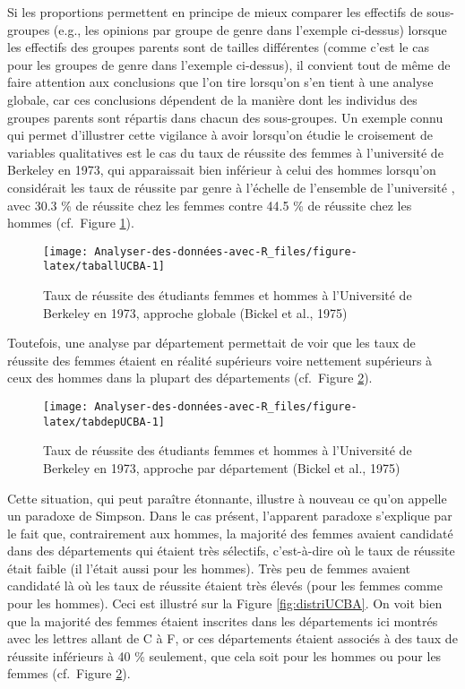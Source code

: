 \documentclass[
]{book}
\begin{document}
Si les proportions permettent en principe de mieux comparer les effectifs de sous-groupes (e.g., les opinions par groupe de genre dans l'exemple ci-dessus) lorsque les effectifs des groupes parents sont de tailles différentes (comme c'est le cas pour les groupes de genre dans l'exemple ci-dessus), il convient tout de même de faire attention aux conclusions que l'on tire lorsqu'on s'en tient à une analyse globale, car ces conclusions dépendent de la manière dont les individus des groupes parents sont répartis dans chacun des sous-groupes. Un exemple connu qui permet d'illustrer cette vigilance à avoir lorsqu'on étudie le croisement de variables qualitatives est le cas du taux de réussite des femmes à l'université de Berkeley en 1973, qui apparaissait bien inférieur à celui des hommes lorsqu'on considérait les taux de réussite par genre à l'échelle de l'ensemble de l'université \autocite{bickelSexBiasGraduate1975}, avec 30.3 \% de réussite chez les femmes contre 44.5 \% de réussite chez les hommes (cf.~Figure \ref{fig:taballUCBA}).

\begin{figure}

{\centering \texttt{[image: Analyser-des-données-avec-R\_files/figure-latex/taballUCBA-1]} 

}

\caption{Taux de réussite des étudiants femmes et hommes à l'Université de Berkeley en 1973, approche globale (Bickel et al., 1975)}\label{fig:taballUCBA}
\end{figure}

Toutefois, une analyse par département permettait de voir que les taux de réussite des femmes étaient en réalité supérieurs voire nettement supérieurs à ceux des hommes dans la plupart des départements (cf.~Figure \ref{fig:tabdepUCBA}).

\begin{figure}

{\centering \texttt{[image: Analyser-des-données-avec-R\_files/figure-latex/tabdepUCBA-1]} 

}

\caption{Taux de réussite des étudiants femmes et hommes à l'Université de Berkeley en 1973, approche par département (Bickel et al., 1975)}\label{fig:tabdepUCBA}
\end{figure}

Cette situation, qui peut paraître étonnante, illustre à nouveau ce qu'on appelle un paradoxe de Simpson. Dans le cas présent, l'apparent paradoxe s'explique par le fait que, contrairement aux hommes, la majorité des femmes avaient candidaté dans des départements qui étaient très sélectifs, c'est-à-dire où le taux de réussite était faible (il l'était aussi pour les hommes). Très peu de femmes avaient candidaté là où les taux de réussite étaient très élevés (pour les femmes comme pour les hommes). Ceci est illustré sur la Figure \ref{fig:distriUCBA}. On voit bien que la majorité des femmes étaient inscrites dans les départements ici montrés avec les lettres allant de C à F, or ces départements étaient associés à des taux de réussite inférieurs à 40 \% seulement, que cela soit pour les hommes ou pour les femmes (cf.~Figure \ref{fig:tabdepUCBA}).
\end{document}
